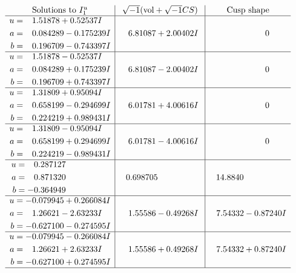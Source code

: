 \documentclass[1p]{elsarticle_modified}
\theoremstyle{definition}
\newcommand{\I}{\sqrt{-1}}
\begin{document}
$$\begin{array}{c|c|c}
\text{Solutions to }I^u_{1}& \I (\text{vol} + \sqrt{-1}CS) & \text{Cusp shape}\\
 \hline 
\begin{aligned}
u &= \phantom{-}1.51878 + 0.52537 I \\
a &= \phantom{-}0.084289 - 0.175239 I \\
b &= \phantom{-}0.196709 - 0.743397 I\end{aligned}
 & \phantom{-}6.81087 + 2.00402 I & \phantom{-0.000000 } 0 \\ \hline\begin{aligned}
u &= \phantom{-}1.51878 - 0.52537 I \\
a &= \phantom{-}0.084289 + 0.175239 I \\
b &= \phantom{-}0.196709 + 0.743397 I\end{aligned}
 & \phantom{-}6.81087 - 2.00402 I & \phantom{-0.000000 } 0 \\ \hline\begin{aligned}
u &= \phantom{-}1.31809 + 0.95094 I \\
a &= \phantom{-}0.658199 - 0.294699 I \\
b &= \phantom{-}0.224219 + 0.989431 I\end{aligned}
 & \phantom{-}6.01781 + 4.00616 I & \phantom{-0.000000 } 0 \\ \hline\begin{aligned}
u &= \phantom{-}1.31809 - 0.95094 I \\
a &= \phantom{-}0.658199 + 0.294699 I \\
b &= \phantom{-}0.224219 - 0.989431 I\end{aligned}
 & \phantom{-}6.01781 - 4.00616 I & \phantom{-0.000000 } 0 \\ \hline\begin{aligned}
u &= \phantom{-}0.287127\phantom{ +0.000000I} \\
a &= \phantom{-}0.871320\phantom{ +0.000000I} \\
b &= -0.364949\phantom{ +0.000000I}\end{aligned}
 & \phantom{-}0.698705\phantom{ +0.000000I} & \phantom{-}14.8840\phantom{ +0.000000I} \\ \hline\begin{aligned}
u &= -0.079945 + 0.266084 I \\
a &= \phantom{-}1.26621 - 2.63233 I \\
b &= -0.627100 - 0.274595 I\end{aligned}
 & \phantom{-}1.55586 - 0.49268 I & \phantom{-}7.54332 - 0.87240 I \\ \hline\begin{aligned}
u &= -0.079945 - 0.266084 I \\
a &= \phantom{-}1.26621 + 2.63233 I \\
b &= -0.627100 + 0.274595 I\end{aligned}
 & \phantom{-}1.55586 + 0.49268 I & \phantom{-}7.54332 + 0.87240 I\\
 \hline 
 \end{array}$$\newpage\newpage\renewcommand{\arraystretch}{1}
\end{document}
